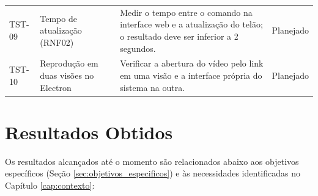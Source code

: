 \begin{table}[H]
{\begin{tabularx}{\textwidth}{>{\raggedright\arraybackslash}p{1.3cm}>{\raggedright\arraybackslash}p{3.2cm}X>{\raggedright\arraybackslash}p{2.2cm}}
    \addlinespace
    TST-09 & Tempo de atualização (RNF02) & Medir o tempo entre o comando na interface web e a atualização do telão; o resultado deve ser inferior a 2 segundos. & Planejado \\
    \addlinespace
    TST-10 & Reprodução em duas visões no Electron & Verificar a abertura do vídeo pelo link em uma visão e a interface própria do sistema na outra. & Planejado \\
    \bottomrule
  \end{tabularx}%
}{%
}
\end{table}

\section{Resultados Obtidos}

Os resultados alcançados até o momento são relacionados abaixo aos objetivos específicos (Seção \ref{sec:objetivos_especificos}) e às necessidades identificadas no Capítulo \ref{cap:contexto}:

